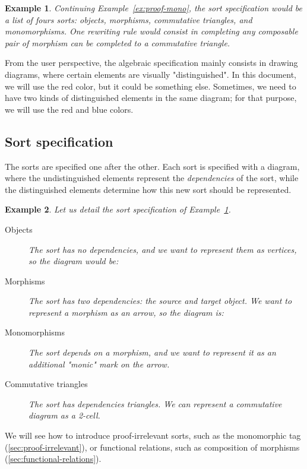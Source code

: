 \documentclass{article}
\newtheorem{example}{Example}[section]
\begin{document}
\begin{example}
    \label{ex:proof-mono-alg-spec}
    Continuing Example~\ref{ex:proof-mono}, the sort specification would be a list of fours sorts: objects, morphisms, commutative triangles, and monomorphisms.
One rewriting rule would consist in completing 
any composable pair of morphism can be completed to a commutative triangle.
\end{example}

From the user perspective, the algebraic specification mainly consists in drawing diagrams, where certain elements are visually "distinguished". 
In this document, we will use the red color, but it could be something else.
Sometimes, we need to have two kinds of distinguished elements in the same diagram; for that purpose, we will use the 
red and blue colors.


\subsection{Sort specification}
\label{sec:sort-specification}
The sorts are specified one after the other.
Each sort is specified with a diagram, where the undistinguished elements represent the \emph{dependencies} of the sort, 
while the distinguished elements determine how this new sort should be represented.
\begin{example}
    Let us detail the sort specification of Example~\ref{ex:proof-mono-alg-spec}.
    \begin{description}
        \item[Objects]
        The sort has no dependencies, and we want to represent them as vertices, so the diagram would be:
         \[
        
    \]
    \item[Morphisms]
    The sort has two dependencies: the source and target object. We want to represent a morphism as an arrow, so the diagram is:
    \[
        
    \]
    \item[Monomorphisms]
     The sort depends on a morphism, and 
     we want to represent it as an additional "monic" mark on the arrow.
    \[
        
    \]
    \item[Commutative triangles] 
     The sort has dependencies triangles. We can represent a commutative diagram as a 2-cell.
    \[
        
    \]
    \end{description}

    
\end{example}
We will see how to introduce proof-irrelevant sorts, such as the monomorphic tag (\cref{sec:proof-irrelevant}), or functional relations, such as composition of morphisms 
(\cref{sec:functional-relations}).
\end{document}
